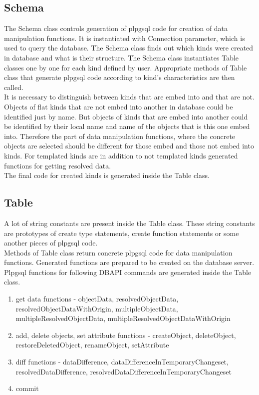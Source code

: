 \documentclass[deska]{subfiles}
\begin{document}
\subsection{Schema}
The Schema class controls generation of plpgsql code for creation of data manipulation functions. It is instantiated with Connection parameter, which is used to query the database. 
The Schema class finds out which kinds were created in database and what is their structure. The Schema class instantiates Table classes one by one for each kind defined by user. Appropriate methods of Table class that generate plpgsql code according to kind's characteristics are then called.\\ It is necessary to distinguish between kinds that are embed into and that are not. Objects of flat kinds that are not embed into another in database could be identified just by name. But objects of kinds that are embed into another could be identified by their local name and name of the objects that is this one embed into. Therefore the part of data manipulation functions, where the concrete objects are selected should be different for those embed and those not embed into kinds.
For templated kinds are in addition to not templated kinds generated functions for getting resolved data.\\
The final code for created kinds is generated inside the Table class.

\subsection{Table}
A lot of string constants are present inside the Table class. These string constants are prototypes of create type statements, create function statements or some another pieces of plpgsql code.\\
Methods of Table class return concrete plpgsql code for data manipulation functions. Generated functions are prepared to be created on the database server.\\
Plpgsql functions for following DBAPI commands are generated inside the Table class.

\begin{enumerate}
    \item get data functions - objectData, resolvedObjectData, resolvedObjectDataWithOrigin, multipleObjectData, multipleResolvedObjectData, multipleResolvedObjectDataWithOrigin
    \item add, delete objects, set attribute functions - createObject, deleteObject, restoreDeletedObject, renameObject, setAttribute
    \item diff functions - dataDifference, dataDifferenceInTemporaryChangeset, resolvedDataDifference, resolvedDataDifferenceInTemporaryChangeset
    \item commit
\end{enumerate}
\end{document}
